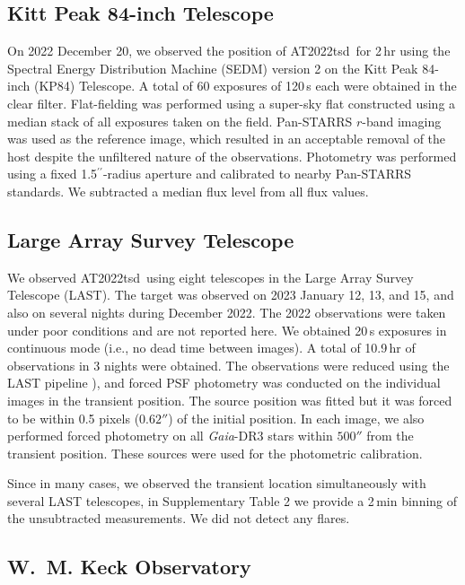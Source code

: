 \documentclass{nature_plusfigure}
\newcommand{\at}{AT2022tsd}
\newcommand{\arcsec}{$^{\prime\prime}$}
\begin{document}
\begin{methods}
\subsection{Kitt Peak 84-inch Telescope}
\label{sec:kp84}

On 2022 December 20, we observed the position of \at\ for 2\,hr using the Spectral Energy Distribution Machine (SEDM\cite{Blagorodnova2018}) version 2 on the Kitt Peak 84-inch (KP84) Telescope. A total of 60 exposures of 120\,s each were obtained in the clear filter. Flat-fielding was performed using a super-sky flat constructed using a median stack of all exposures taken on the field.  Pan-STARRS $r$-band imaging was used as the reference image, which resulted in an acceptable removal of the host despite the unfiltered nature of the observations.  Photometry was performed using a fixed 1.5\arcsec-radius aperture and calibrated to nearby Pan-STARRS standards. We subtracted a median flux level from all flux values.

\subsection{Large Array Survey Telescope}
\label{sec:last}

We observed \at\ using eight telescopes in the Large Array Survey Telescope (LAST\cite{Ofek2023,BenAmi2023}).
The target was observed on 2023 January 12, 13, and 15, and also on several nights during December 2022.
The 2022 observations were taken under poor conditions and are not reported here.
We obtained 20\,s exposures in continuous mode (i.e., no dead time between images).
A total of 10.9\,hr of observations in 3 nights were obtained.
The observations were reduced using the LAST pipeline \cite{Ofek2014,Ofek2019,Ofek2023}), and forced PSF photometry was conducted on the individual images
in the transient position. 
The source position was fitted but it was forced to be within 0.5 pixels ($0.62''$) of the initial position.
In each image, we also performed forced photometry on all {\it Gaia}-DR3\cite{Gaia2021} stars
within $500''$ from the transient position.
These sources were used for the photometric calibration.

Since in many cases, we observed the transient location simultaneously with several LAST telescopes, in Supplementary Table 2 we provide a 2\,min binning of the unsubtracted measurements. We did not detect any flares.

\subsection{W.~M. Keck Observatory}
\label{sec:keck}


\end{methods}
\end{document}
